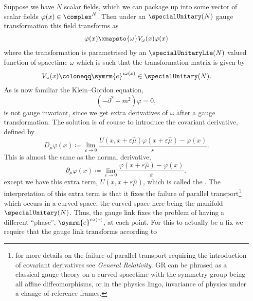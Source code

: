 \documentclass[fleqn]{NotesClass}
\newcommand*{\course}[1]{\textit{#1}}
\newcommand{\e}{\symrm{e}}
\newcommand{\covariantDerivative}{D}
\newcommand{\dalembertian}{\partial^2}
\begin{document}
    Suppose we have \(N\) scalar fields, which we can package up into some vector of scalar fields \(\varphi(x) \in \complex^N\).
    Then under an \(\specialUnitary(N)\) gauge transformation this field transforms as
    \begin{equation}
        \varphi(x) \xmapsto{\omega} V_\omega(x) \varphi(x)
    \end{equation}
    where the transformation is parametrised by an \(\specialUnitaryLie(N)\) valued function of spacetime \(\omega\) which is such that the transformation matrix is given by
    \begin{equation}
        V_\omega(x) \coloneqq \e^{i\omega(x)} \in \specialUnitary(N).
    \end{equation}
    As is now familiar the Klein--Gordon equation,
    \begin{equation}
        (-\dalembertian + m^2) \varphi = 0,
    \end{equation}
    is not gauge invariant, since we get extra derivatives of \(\omega\) after a gauge transformation.
    The solution is of course to introduce the covariant derivative, defined by
    \begin{equation}
        \covariantDerivative_\mu \varphi(x) \coloneqq \lim_{\varepsilon \to 0} \frac{U(x, x + \varepsilon\hat{\mu}) \varphi(x + \varepsilon\hat{\mu}) - \varphi(x)}{\varepsilon}.
    \end{equation}
    This is almost the same as the normal derivative,
    \begin{equation}
        \partial_\mu \varphi(x) \coloneqq \lim_{\varepsilon \to 0} \frac{\varphi(x + \varepsilon\hat{\mu}) - \varphi(x)}{\varepsilon},
    \end{equation}
    except we have this extra term, \(U(x, x + \varepsilon\hat{\mu})\), which is called the .
    The interpretation of this extra term is that it fixes the failure of parallel transport\footnote{for more details on the failure of parallel transport requiring the introduction of covariant derivatives see \course{General Relativity}. GR can be phrased as a classical gauge theory on a curved spacetime with the symmetry group being all affine diffeomorphisms, or in the physics lingo, invariance of physics under a change of reference frames.} which occurs in a curved space, the curved space here being the manifold \(\specialUnitary(N)\).
    Thus, the gauge link fixes the problem of having a different \enquote{phase}, \(\e^{i\omega(x)}\), at each point.
    For this to actually be a fix we require that the gauge link transforms according to
\end{document}
